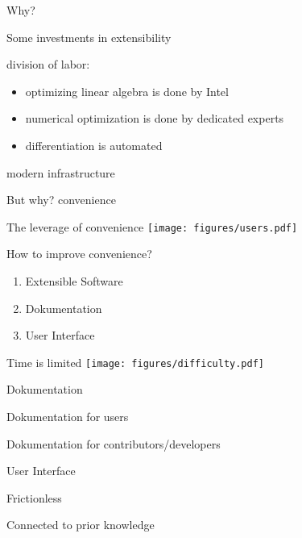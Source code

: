 \documentclass{beamer}
\newenvironment{wideitemize}{
    \itemize\addtolength{\itemsep}{15pt}\addtolength{\topsep}{10pt}}{\enditemize}
\begin{document}
    \begin{frame}{Why?}
        \begin{wideitemize}
        \item Some investments in extensibility
        \item division of labor: \begin{itemize}
            \item optimizing linear algebra is done by Intel
            \item numerical optimization is done by dedicated experts
            \item differentiation is automated
        \end{itemize}
        \item modern infrastructure
        \end{wideitemize}
    \end{frame}

    \begin{frame}{But why?}
    \centering \huge convenience
    \end{frame}
    
    \begin{frame}[c]{The leverage of convenience}
    \centering
    \texttt{[image: figures/users.pdf]}
    \end{frame}
    
    \begin{frame}{How to improve convenience?}
      \begin{enumerate}
        \item Extensible Software
        \item Dokumentation
        \item User Interface
      \end{enumerate}
    \end{frame}
    
  \begin{frame}[c]{Time is limited}
    \centering
    \texttt{[image: figures/difficulty.pdf]}
  \end{frame}

    \begin{frame}{Dokumentation}
      \begin{wideitemize}
        \item Dokumentation for users
        \item Dokumentation for contributors/developers
      \end{wideitemize}
    \end{frame}

    \begin{frame}{User Interface}
      \begin{wideitemize}
        \item Frictionless
        \item Connected to prior knowledge
      \end{wideitemize}
    \end{frame}
\end{document}
